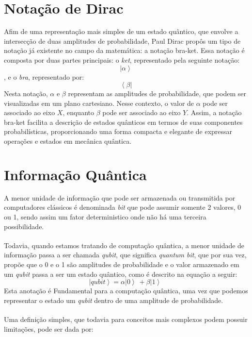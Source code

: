\documentclass[11pt]{article}
\begin{document}
\section{Notação de Dirac}
Afim de uma representação mais simples de um estado quântico, que envolve a intersecção de duas amplitudes de probabilidade, Paul Dirac propôs um tipo de notação já existente no campo da matemática: a notação bra-ket.
Essa notação é composta por duas partes principais: o \textit{ket}, representado pela seguinte notação: \[ \left|\alpha\right\rangle \], e o \textit{bra}, representado por: \[ \left\langle\beta\right| \]
Nesta notação, \(\alpha\) e \(\beta\) representam as amplitudes de probabilidade, que podem ser visualizadas em um plano cartesiano. Nesse contexto, o valor de \(\alpha\) pode ser associado ao eixo \(X\), enquanto \(\beta\) pode ser associado ao eixo \(Y\). Assim, a notação bra-ket facilita a descrição de estados quânticos em termos de suas componentes probabilísticas, proporcionando uma forma compacta e elegante de expressar operações e estados em mecânica quântica.


 

\maketitle
\section{Informação Quântica}
A menor unidade de informação que pode ser armazenada ou transmitida por computadores clássicos é denominada \textit{bit} que pode assumir somente 2 valores, 0 ou 1, sendo assim um fator deterministico onde não há uma terceira possibilidade.\\ \\
Todavia, quando estamos tratando de computação quântica, a menor unidade de informação passa a ser chamada \textit{qubit}, que significa \textit{quantum bit}, que por sua vez, propõe que o 0 e o 1 são amplitudes de probabilidade e o valor armazenado em um \textit{qubit} passa a ser um estado quântico, como é descrito na equação a seguir:
\[ \left|qubit\right\rangle = \alpha\left|0\right\rangle \ +  \beta\left|1\right\rangle \ \] 
Esta anotação é Fundamental para a computação quântica, uma vez que podemos representar o estado um \textit{qubit} dentro de uma amplitude de probabilidade. \\ \\
Uma definição simples, que todavia para conceitos mais complexos podem possuir limitações, pode ser dada por: \\ \\
\end{document}

